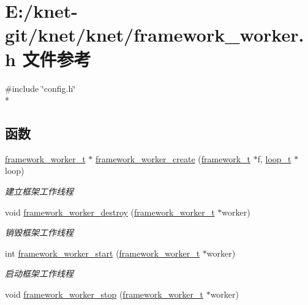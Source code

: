 \hypertarget{a00061}{}\section{E\+:/knet-\/git/knet/knet/framework\+\_\+worker.h 文件参考}
\label{a00061}
{\ttfamily \#include \char`\"{}config.\+h\char`\"{}}\\*
\subsection*{函数}
\begin{DoxyCompactItemize}
\item 
\hyperlink{a00051_aeb7a44e6b579659a8aae81f3ab819af3_aeb7a44e6b579659a8aae81f3ab819af3}{framework\+\_\+worker\+\_\+t} $\ast$ \hyperlink{a00061_a033314598ad1544a7b6cc0cf2e5930f2_a033314598ad1544a7b6cc0cf2e5930f2}{framework\+\_\+worker\+\_\+create} (\hyperlink{a00051_a6149d769f6f07ed14a40a271c95d8463_a6149d769f6f07ed14a40a271c95d8463}{framework\+\_\+t} $\ast$f, \hyperlink{a00051_a9c3ad1cd2de83e09f3a7b59fa82c94ee_a9c3ad1cd2de83e09f3a7b59fa82c94ee}{loop\+\_\+t} $\ast$loop)
\begin{DoxyCompactList}\small\item\em 建立框架工作线程 \end{DoxyCompactList}\item 
void \hyperlink{a00061_add5ddcbe427122e3afe63a10e3448116_add5ddcbe427122e3afe63a10e3448116}{framework\+\_\+worker\+\_\+destroy} (\hyperlink{a00051_aeb7a44e6b579659a8aae81f3ab819af3_aeb7a44e6b579659a8aae81f3ab819af3}{framework\+\_\+worker\+\_\+t} $\ast$worker)
\begin{DoxyCompactList}\small\item\em 销毁框架工作线程 \end{DoxyCompactList}\item 
int \hyperlink{a00061_a8791f9f6e107cd5127797cbffcd65ea8_a8791f9f6e107cd5127797cbffcd65ea8}{framework\+\_\+worker\+\_\+start} (\hyperlink{a00051_aeb7a44e6b579659a8aae81f3ab819af3_aeb7a44e6b579659a8aae81f3ab819af3}{framework\+\_\+worker\+\_\+t} $\ast$worker)
\begin{DoxyCompactList}\small\item\em 启动框架工作线程 \end{DoxyCompactList}\item 
void \hyperlink{a00061_a22e4e55cc90068dc691d1b4de736fd6e_a22e4e55cc90068dc691d1b4de736fd6e}{framework\+\_\+worker\+\_\+stop} (\hyperlink{a00051_aeb7a44e6b579659a8aae81f3ab819af3_aeb7a44e6b579659a8aae81f3ab819af3}{framework\+\_\+worker\+\_\+t} $\ast$worker)

\end{DoxyCompactItemize}
